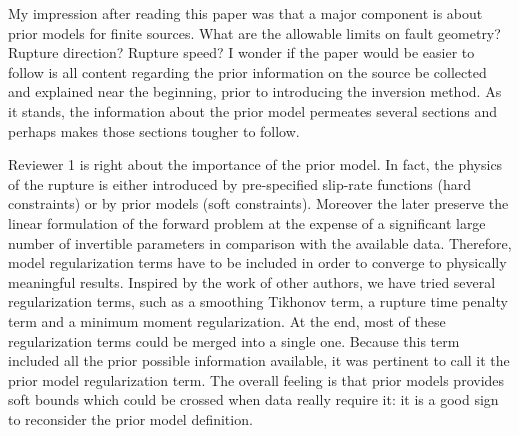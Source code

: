\documentclass[10pt]{extarticle}
\begin{document}
%
%
\begin{ReviewerComment}{1}
\noindent 
 My impression after reading this paper was that a major component is about prior models
 for finite sources. What are the allowable limits on fault geometry? Rupture direction?
 Rupture speed? I wonder if the paper would be easier to follow is all content regarding
 the prior information on the source be collected and explained near the beginning, prior
 to introducing the inversion method. As it stands, the information about the prior model
 permeates several sections and perhaps makes those sections tougher to follow.
\end{ReviewerComment}
%
\begin{Answer}
Reviewer 1 is right about the importance of the prior model. In fact, the physics of the
rupture is either introduced by pre-specified slip-rate functions (hard constraints) or
by prior models (soft constraints). Moreover the later preserve the linear formulation of
the forward problem at the expense of a significant large number of invertible parameters
in comparison with the available data. Therefore, model regularization terms have to be
included in order to converge to physically meaningful results. Inspired by the work of
other authors, we have tried several regularization terms, such as a smoothing Tikhonov
term, a rupture time penalty term and a minimum moment regularization. At the end, most
of these  regularization terms could be merged into a single one. Because this term
included all the prior possible information available, it was pertinent to call it the 
prior model regularization term. The overall feeling is that prior models provides soft
bounds which could be crossed when data really require it: it is a good sign to reconsider
the prior model definition.\\
\\

\end{Answer}
\end{document}
